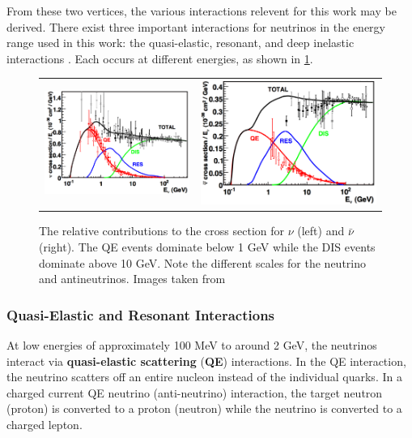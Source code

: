 From these two vertices, the various interactions relevent for this work may be derived.
There exist three important interactions for neutrinos in the energy range used in this work: the quasi-elastic, resonant, and deep inelastic interactions \cite{Formaggio-Xsec}.
Each occurs at different energies, as shown in \ref{fig:xsec}.

\begin{figure}
\centering
\begin{tabular}{@{}ll@{}}
\includegraphics[width=0.4\linewidth]{nu_xsec_formaggio.png}
 & 
\includegraphics[width=0.4\linewidth]{nubar_xsec_formaggio.png}
 \\ 
\end{tabular}
\label{fig:xsec}
\caption{The relative contributions to the cross section for $\nu$ (left) and $\bar{\nu}$ (right). The QE events dominate below 1 GeV while the DIS events dominate above 10 GeV. Note the different scales for the neutrino and antineutrinos. Images taken from \cite{Formaggio-Xsec}}
\end{figure}

\subsubsection{Quasi-Elastic and Resonant Interactions}
At low energies of approximately 100 MeV to around 2 GeV, the neutrinos interact via \textbf{quasi-elastic scattering} (\textbf{QE}) interactions.
In the QE interaction, the neutrino scatters off an entire nucleon instead of the individual quarks.
In a charged current QE neutrino (anti-neutrino) interaction, the target neutron (proton) is converted to a proton (neutron) while the neutrino is converted to a charged lepton.

